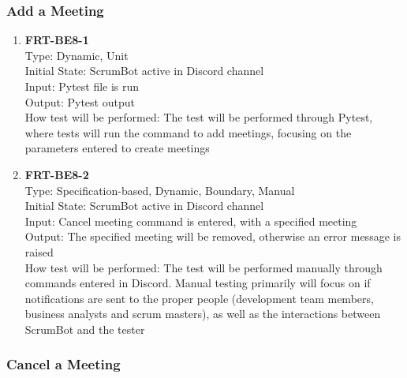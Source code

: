 \documentclass[12pt, titlepage]{article}
\begin{document}
\subsubsection{Add a Meeting}

\begin{enumerate}
    \item{\textbf{FRT-BE8-1}}\\
    Type: Dynamic, Unit\\
    Initial State: ScrumBot active in Discord channel\\
    Input: Pytest file is run\\
    Output: Pytest output\\
    How test will be performed: The test will be performed through Pytest, where tests will run the command to add meetings, focusing on the parameters entered to create meetings\\
    
    \item{\textbf{FRT-BE8-2}}\\
    Type: Specification-based, Dynamic, Boundary, Manual\\
    Initial State: ScrumBot active in Discord channel\\
    Input: Cancel meeting command is entered, with a specified meeting\\
    Output: The specified meeting will be removed, otherwise an error message is raised\\
    How test will be performed: The test will be performed manually through commands entered in Discord. Manual testing primarily will focus on if notifications are sent to the proper people (development team members, business analysts and scrum masters), as well as the interactions between ScrumBot and the tester\\
\end{enumerate}

\subsubsection{Cancel a Meeting}
\end{document}
